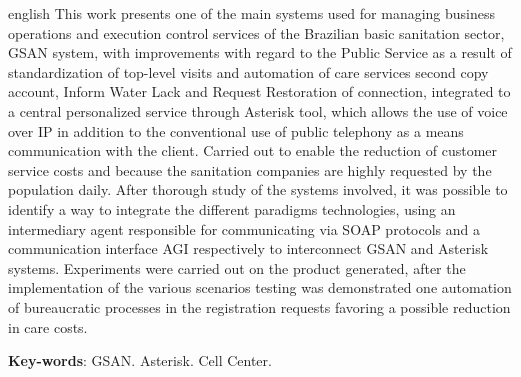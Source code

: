 \begin{resumo}[Abstract]
 \begin{otherlanguage*}{english}
This work presents one of the main systems used for managing business operations and execution control services of the Brazilian basic sanitation sector, GSAN system, with improvements with regard to the Public Service as a result of standardization of top-level visits and automation of care services second copy account, Inform Water Lack and Request Restoration of connection, integrated to a central personalized service through Asterisk tool, which allows the use of voice over IP in addition to the conventional use of public telephony as a means communication with the client. Carried out to enable the reduction of customer service costs and because the sanitation companies are highly requested by the population daily. After thorough study of the systems involved, it was possible to identify a way to integrate the different paradigms technologies, using an intermediary agent responsible for communicating via SOAP protocols and a communication interface AGI respectively to interconnect GSAN and Asterisk systems. Experiments were carried out on the product generated, after the implementation of the various scenarios testing was demonstrated one automation of bureaucratic processes in the registration requests favoring a possible reduction in care costs.

   \vspace{\onelineskip}
 
   \noindent 
   \textbf{Key-words}: GSAN. Asterisk. Cell Center.
 \end{otherlanguage*}
\end{resumo}